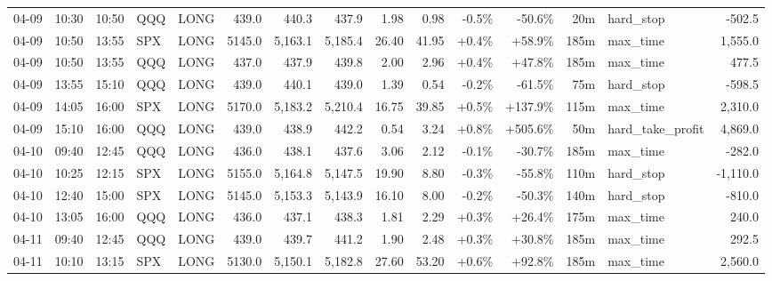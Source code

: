 \documentclass[11pt,a4paper,twoside]{article}
\begin{document}
\begin{landscape}
\begin{center}
\begin{longtable}{>{\color{txtmain}}l l l l l r r r r r r r r >{\color{txtmain}}l r}
04-09 & 10:30 & 10:50 & QQQ & LONG & 439.0 & 440.3 & 437.9 & 1.98 & 0.98 & \textcolor{lossred}{-0.5\%} & \textcolor{lossred}{-50.6\%} & 20m & hard\_stop & \textcolor{lossred}{-502.5} \\
04-09 & 10:50 & 13:55 & SPX & LONG & 5145.0 & 5,163.1 & 5,185.4 & 26.40 & 41.95 & \textcolor{wingreen}{+0.4\%} & \textcolor{wingreen}{+58.9\%} & 185m & max\_time & \textcolor{wingreen}{1,555.0} \\
04-09 & 10:50 & 13:55 & QQQ & LONG & 437.0 & 437.9 & 439.8 & 2.00 & 2.96 & \textcolor{wingreen}{+0.4\%} & \textcolor{wingreen}{+47.8\%} & 185m & max\_time & \textcolor{wingreen}{477.5} \\
04-09 & 13:55 & 15:10 & QQQ & LONG & 439.0 & 440.1 & 439.0 & 1.39 & 0.54 & \textcolor{lossred}{-0.2\%} & \textcolor{lossred}{-61.5\%} & 75m & hard\_stop & \textcolor{lossred}{-598.5} \\
04-09 & 14:05 & 16:00 & SPX & LONG & 5170.0 & 5,183.2 & 5,210.4 & 16.75 & 39.85 & \textcolor{wingreen}{+0.5\%} & \textcolor{wingreen}{+137.9\%} & 115m & max\_time & \textcolor{wingreen}{2,310.0} \\
04-09 & 15:10 & 16:00 & QQQ & LONG & 439.0 & 438.9 & 442.2 & 0.54 & 3.24 & \textcolor{wingreen}{+0.8\%} & \textcolor{wingreen}{+505.6\%} & 50m & hard\_take\_profit & \textcolor{wingreen}{4,869.0} \\
04-10 & 09:40 & 12:45 & QQQ & LONG & 436.0 & 438.1 & 437.6 & 3.06 & 2.12 & \textcolor{lossred}{-0.1\%} & \textcolor{lossred}{-30.7\%} & 185m & max\_time & \textcolor{lossred}{-282.0} \\
04-10 & 10:25 & 12:15 & SPX & LONG & 5155.0 & 5,164.8 & 5,147.5 & 19.90 & 8.80 & \textcolor{lossred}{-0.3\%} & \textcolor{lossred}{-55.8\%} & 110m & hard\_stop & \textcolor{lossred}{-1,110.0} \\
04-10 & 12:40 & 15:00 & SPX & LONG & 5145.0 & 5,153.3 & 5,143.9 & 16.10 & 8.00 & \textcolor{lossred}{-0.2\%} & \textcolor{lossred}{-50.3\%} & 140m & hard\_stop & \textcolor{lossred}{-810.0} \\
04-10 & 13:05 & 16:00 & QQQ & LONG & 436.0 & 437.1 & 438.3 & 1.81 & 2.29 & \textcolor{wingreen}{+0.3\%} & \textcolor{wingreen}{+26.4\%} & 175m & max\_time & \textcolor{wingreen}{240.0} \\
04-11 & 09:40 & 12:45 & QQQ & LONG & 439.0 & 439.7 & 441.2 & 1.90 & 2.48 & \textcolor{wingreen}{+0.3\%} & \textcolor{wingreen}{+30.8\%} & 185m & max\_time & \textcolor{wingreen}{292.5} \\
04-11 & 10:10 & 13:15 & SPX & LONG & 5130.0 & 5,150.1 & 5,182.8 & 27.60 & 53.20 & \textcolor{wingreen}{+0.6\%} & \textcolor{wingreen}{+92.8\%} & 185m & max\_time & \textcolor{wingreen}{2,560.0} \\

\end{longtable}
\end{center}
\end{landscape}
\end{document}
